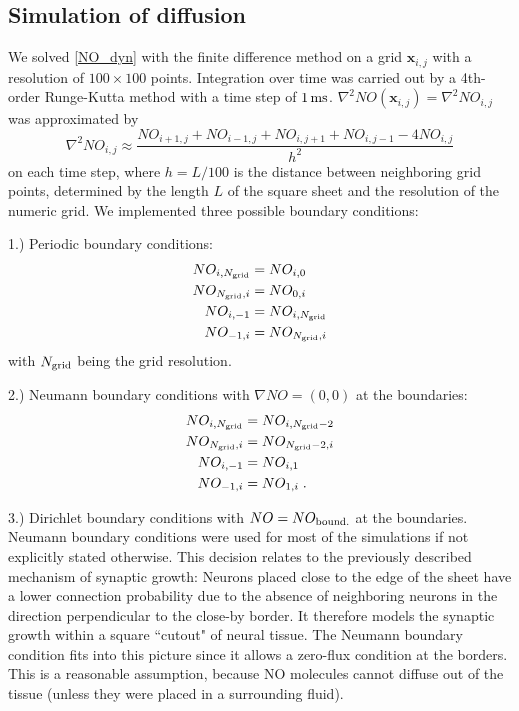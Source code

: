 \documentclass[10pt,letterpaper]{article}
\begin{document}
\subsection*{Simulation of diffusion}
We solved \eqref{NO_dyn} with the finite difference method on a grid $\mathbf{x}_{i,j}$ with a resolution of $100\times 100$ points. Integration over time was carried out by a 4th-order Runge-Kutta method with a time step of $\rm 1\, ms$. $\nabla^2 NO(\mathbf{x}_{i,j}) = \nabla^2 NO_{i,j}$ was approximated by
\begin{equation}
\nabla^2 NO_{i,j} \approx \frac{NO_{i+1,j}+NO_{i-1,j}+NO_{i,j+1}+NO_{i,j-1}-4NO_{i,j}}{h^2}
\label{Laplace_Numeric}
\end{equation}
on each time step, where $h = L/100$ is the distance between neighboring grid points, determined by the length $L$ of the square sheet and the resolution of the numeric grid. We implemented three possible boundary conditions:

1.) Periodic boundary conditions:
\begin{align}
NO_{i,N_{\rm grid}} &= NO_{i,0} \label{Periodic_Cond_1} \\
NO_{N_{\rm grid},i} &= NO_{0,i} \label{Periodic_Cond_2} \\
NO_{i,-1} &= NO_{i,N_{\rm grid}} \label{Periodic_Cond_3} \\
NO_{-1,i} &= NO_{N_{\rm grid},i} \label{Periodic_Cond_4}
\end{align}
with $N_{\rm grid}$ being the grid resolution.

2.) Neumann boundary conditions with $\nabla NO = (0,0)$ at the boundaries:
\begin{align}
NO_{i,N_{\rm grid}} &= NO_{i,N_{\rm grid}-2} \label{Neumann_Cond_1} \\
NO_{N_{\rm grid},i} &= NO_{N_{\rm grid}-2,i} \label{Neumann_Cond_2} \\
NO_{i,-1} &= NO_{i,1} \label{Neumann_Cond_3} \\
NO_{-1,i} &= NO_{1,i} \; . \label{Neumann_Cond_4}
\end{align}

3.) Dirichlet boundary conditions with $NO = NO_{\rm bound.}$ at the boundaries.\\
Neumann boundary conditions were used for most of the simulations if not explicitly stated otherwise. This decision relates to the previously described mechanism of synaptic growth: Neurons placed close to the edge of the sheet have a lower connection probability due to the absence of neighboring neurons in the direction perpendicular to the close-by border. It therefore models the synaptic growth within a square ``cutout" of neural tissue. The Neumann boundary condition fits into this picture since it allows a zero-flux condition at the borders. This is a reasonable assumption, because NO molecules cannot diffuse out of the tissue (unless they were placed in a surrounding fluid).
\end{document}

